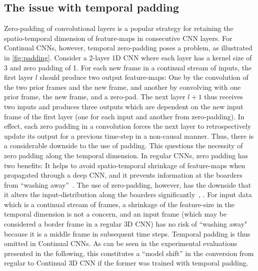 \subsection{The issue with temporal padding}
Zero-padding of convolutional layers is a popular strategy for retaining the spatio-temporal dimension of feature-maps in consecutive CNN layers.
For Continual CNNs, however, temporal zero-padding poses a problem, as illustrated in \cref{fig:padding}. 
Consider a 2-layer 1D CNN where each layer has a kernel size of 3 and zero padding of 1.
For each new frame in a continual stream of inputs, the first layer $l$ should produce two output feature-maps: One by the convolution of the two prior frames and the new frame, and another by convolving with one prior frame, the new frame, and a zero-pad. %
The next layer $l+1$ thus receives two inputs and produces three outputs which are dependent on the new input frame of the first layer (one for each input and another from zero-padding).
In effect, each zero padding in a convolution forces the next layer to retrospectively update its output for a previous time-step in a non-causal manner.
Thus, there is a considerable downside to the use of padding.
%
This questions the necessity of zero padding along the temporal dimension.
In regular CNNs, zero padding has two benefits:
It helps to avoid spatio-temporal shrinkage of feature-maps when propagated through a deep CNN,
and it prevents information at the boarders from ``washing away''~\cite{karpathy2020cs231n}.
The use of zero-padding, however, has the downside that it alters the input-distribution along the boarders significantly~\cite{liu2018partialpadding}, \cite{nguyen2019distribution}. 
For input data which is a continual stream of frames, a shrinkage of the feature-size in the temporal dimension is not a concern, and an input frame (which may be considered a border frame in a regular 3D CNN) has no risk of ``washing away" because it is a middle frame in subsequent time steps.
Temporal padding is thus omitted in Continual CNNs.
As can be seen in the experimental evaluations presented in the following, this constitutes a ``model shift'' in the conversion from regular to Continual 3D CNN if the former was trained with temporal padding.


